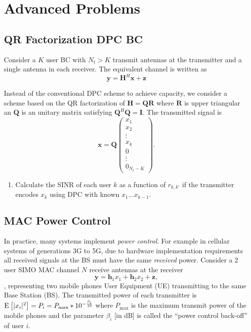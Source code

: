 \documentclass[a4paper,10pt]{article}
\newcommand{\Hb}{\mathbf{H}}
\newcommand{\I}{\mathbf{I}}
\newcommand{\R}{\mathbf{R}}
\newcommand{\Q}{\mathbf{Q}}
\newcommand{\h}{\mathbf{h}}
\newcommand{\x}{\mathbf{x}}
\newcommand{\y}{\mathbf{y}}
\newcommand{\z}{\mathbf{z}}
\newcommand{\Ex}[2]{{\textnormal{E}_{#1}\left[#2\right]}}
\begin{document}
\section{Advanced Problems}
\subsection{QR Factorization DPC BC}

Consider a $K$ user BC with $N_t>K$ transmit antennas at the transmitter and a single antenna in each receiver. The equivalent channel is written as
$$\y=\Hb^H\x+\z$$

Instead of the conventional DPC scheme to achieve capacity, we consider a scheme based on the QR factorization of $\Hb=\Q\R$ where $\R$ is upper triangular an $\Q$ is an unitary matrix satisfying $\Q^H\Q=\I$. The transmitted signal is $$\x=\Q\left(\begin{array}{c}x_1\\x_2\\\vdots\\x_k\\0\\\vdots\\0_{N_t-K}\end{array}\right).$$

\begin{enumerate}
 \item Calculate the SINR of each user $k$ as a function of $r_{k,k'}$ if the transmitter encodes $x_{k}$ using DPC with known $x_{1}\dots x_{k-1}$.
\end{enumerate}

\subsection{MAC Power Control}

In practice, many systems implement \textit{power control}. For example in cellular systems of generations 3G to 5G, due to hardware implementation requirements all received signals at the BS must have the same \textit{received} power. Consider a 2 user SIMO MAC channel $N$ receive antennas at the receiver
$$\y=\h_1 x_1+\h_2 x_2+\z,$$
, representing two mobile phones User Equipment (UE) transmitting to the same Base Station (BS). The transmitted power of each transmitter is $\Ex{}{|x_i|^2}=P_i = P_{\max}*10^{-\frac{\beta_i}{10}}$ where $P_{\max}$ is the maximum transmit power of the mobile phones and the parameter $\beta_i$ [in dB] is called the ``power control back-off'' of user $i$.
\end{document}
